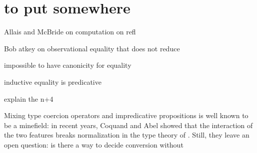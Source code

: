 \section{to put somewhere}

Allais and McBride on computation on refl

Bob atkey on observational equality that does not reduce

impossible to have canonicity for equality

inductive equality is predicative

explain the n+4


Mixing type coercion operators and impredicative propositions is well known to 
be a minefield:
in recent years, Coquand and Abel showed that the interaction of the two features 
breaks normalization in the type theory of \Lean {}.
% 
Still, they leave an open question: is there a way to decide conversion without

 

